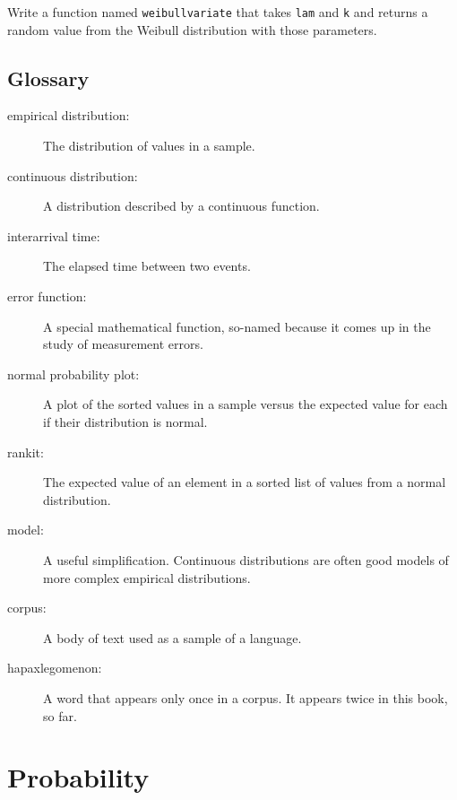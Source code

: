 \documentclass[12pt]{book}
\begin{document}
\begin{ex}

Write a function named \verb"weibullvariate" that takes
\verb"lam" and \verb"k" and returns a random value from the Weibull
distribution with those parameters.

\end{ex}


\section{Glossary}

\begin{description}

\item[empirical distribution:] The distribution of values in a sample.

\item[continuous distribution:] A distribution described by a continuous
function.

\item[interarrival time:] The elapsed time between two events.

\item[error function:] A special mathematical function, so-named
  because it comes up in the study of measurement errors.

\item[normal probability plot:] A plot of the sorted values in a sample
versus the expected value for each if their distribution is normal.

\item[rankit:] The expected value of an element in a sorted list of
values from a normal distribution.

\item[model:] A useful simplification.  Continuous distributions are
often good models of more complex empirical distributions.

\item[corpus:] A body of text used as a sample of a language.

\item[hapaxlegomenon:] A word that appears only once in a corpus.
It appears twice in this book, so far.

\end{description}


\chapter{Probability}
\label{probability}
\end{document}
